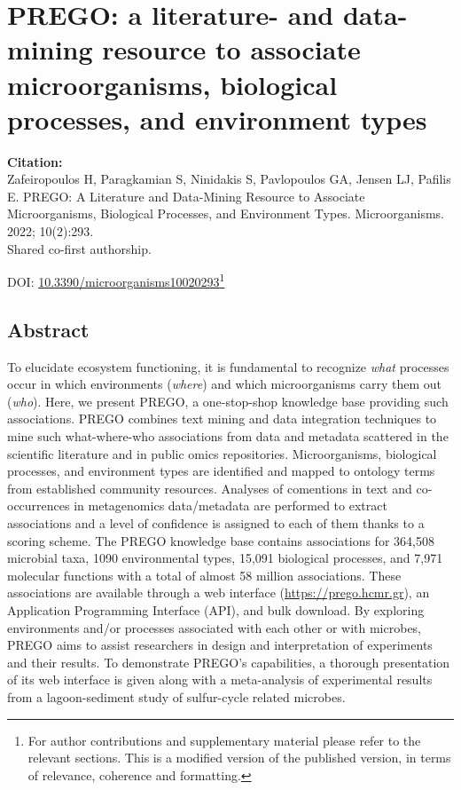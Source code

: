 % 
% 


\chapter{PREGO: a literature- and data-mining resource to associate microorganisms, biological processes, and environment types}
\label{cha:prego}


\textbf{Citation:} \\ 
Zafeiropoulos H, Paragkamian S, Ninidakis S, Pavlopoulos GA, Jensen LJ, Pafilis E. PREGO: A Literature and Data-Mining Resource to Associate Microorganisms, Biological Processes, and Environment Types. Microorganisms. 2022; 10(2):293. \\ 
Shared co-first authorship.

DOI: \href{https://doi.org/10.3390/microorganisms10020293}{10.3390/microorganisms10020293}\footnote{
   For author contributions and supplementary material please refer to the relevant sections. 
   This is a modified version of the published version,
   in terms of relevance, coherence and formatting.
   }



\section{Abstract}

   To elucidate ecosystem functioning, it is fundamental to recognize \textit{what} processes occur in which environments (\textit{where}) and which microorganisms carry them out (\textit{who}). 
   Here, we present PREGO, a one-stop-shop knowledge base providing such associations. 
   PREGO combines text mining and data integration techniques to mine such what-where-who associations from data and metadata scattered in the scientific literature and in public omics repositories. 
   Microorganisms, biological processes, and environment types are identified and mapped to ontology terms from established community resources. 
   Analyses of comentions in text and co-occurrences in metagenomics data/metadata are performed to extract associations and a level of confidence is assigned to each of them thanks to a scoring scheme. 
   The PREGO knowledge base contains associations for 364,508 microbial taxa, 1090 environmental types, 15,091 biological processes, and 7,971 molecular functions with a total of almost 58 million associations. 
   These associations are available through a web interface (\href{https://prego.hcmr.gr}{https://prego.hcmr.gr}), an Application Programming Interface (API), and bulk download. 
   By exploring environments and/or processes associated with each other or with microbes, PREGO aims to assist researchers in design and interpretation of experiments and their results. 
   To demonstrate PREGO's capabilities, a thorough presentation of its web interface is given along with a meta-analysis of experimental results from a lagoon-sediment study of sulfur-cycle related microbes.

